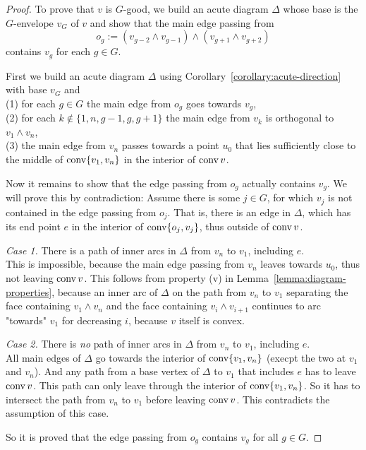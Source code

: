 \begin{proof}
  To prove that $v$ is $G$-good, we build an acute diagram $\Delta$ whose base is the $G$-envelope $v_G$ of $v$ and show that the main edge passing from $$o_g := (v_{g-2} \wedge v_{g-1}) \wedge (v_{g+1} \wedge v_{g+2})$$ contains $v_g$ for each $g \in G$.

  First we build an acute diagram $\Delta$ using Corollary~\ref{corollary:acute-direction} with base $v_G$ and\\
  (1) for each $g \in G$ the main edge from $o_g$ goes towards $v_g$,\\
  (2) for each $k \notin \{1,n,g-1,g,g+1\}$ the main edge from $v_k$ is orthogonal to $v_1 \wedge v_n$,\\
  (3) the main edge from $v_n$ passes towards a point $u_0$ that lies sufficiently close to the middle of $\operatorname{conv} \{v_1,v_n\}$ in the interior of $\operatorname{conv} v$.

  Now it remains to show that the edge passing from $o_g$ actually contains $v_g$. We will prove this by contradiction: Assume there is some $j \in G$, for which $v_j$ is not contained in the edge passing from $o_j$. That is, there is an edge in $\Delta$, which has its end point $e$ in the interior of $\operatorname{conv} \{o_j, v_j\}$, thus outside of $\operatorname{conv} v$.

  \textit{Case 1.} There is a path of inner arcs in $\Delta$ from $v_n$ to $v_1$, including $e$.\\
  This is impossible, because the main edge passing from $v_n$ leaves towards $u_0$, thus not leaving $\operatorname{conv} v$. This follows from property (v) in Lemma~\ref{lemma:diagram-properties}, because an inner arc of $\Delta$ on the path from $v_n$ to $v_1$ separating the face containing $v_1 \wedge v_n$ and the face containing $v_i \wedge v_{i+1}$ continues to arc "towards" $v_1$ for decreasing $i$, because $v$ itself is convex.

  \textit{Case 2.} There is \emph{no} path of inner arcs in $\Delta$ from $v_n$ to $v_1$, including $e$.\\
  All main edges of $\Delta$ go towards the interior of $\operatorname{conv} \{v_1, v_n\}$ (execpt the two at $v_1$ and $v_n$). And any path from a base vertex of $\Delta$ to $v_1$ that includes $e$ has to leave $\operatorname{conv} v$. This path can only leave through the interior of $\operatorname{conv}\{v_1,v_n\}$. So it has to intersect the path from $v_n$ to $v_1$ before leaving $\operatorname{conv} v$. This contradicts the assumption of this case.

  So it is proved that the edge passing from $o_g$ contains $v_g$ for all $g \in G$.
\end{proof}

